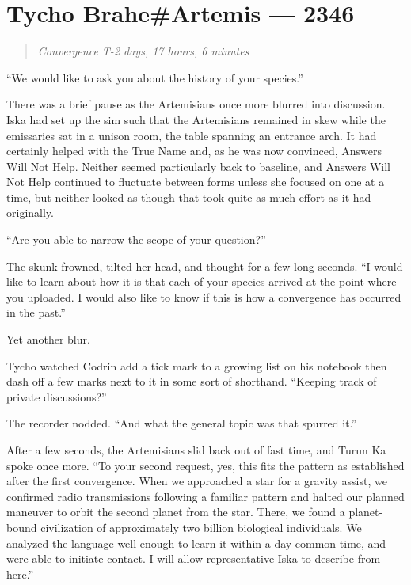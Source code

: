 \hypertarget{tycho-braheartemis-2346}{%
\chapter{Tycho Brahe\#Artemis — 2346}\label{tycho-braheartemis-2346}}

\begin{quote}
\emph{Convergence T-2 days, 17 hours, 6 minutes}
\end{quote}

``We would like to ask you about the history of your species.''

There was a brief pause as the Artemisians once more blurred into discussion. Iska had set up the sim such that the Artemisians remained in skew while the emissaries sat in a unison room, the table spanning an entrance arch. It had certainly helped with the True Name and, as he was now convinced, Answers Will Not Help. Neither seemed particularly back to baseline, and Answers Will Not Help continued to fluctuate between forms unless she focused on one at a time, but neither looked as though that took quite as much effort as it had originally.

``Are you able to narrow the scope of your question?''

The skunk frowned, tilted her head, and thought for a few long seconds. ``I would like to learn about how it is that each of your species arrived at the point where you uploaded. I would also like to know if this is how a convergence has occurred in the past.''

Yet another blur.

Tycho watched Codrin add a tick mark to a growing list on his notebook then dash off a few marks next to it in some sort of shorthand. ``Keeping track of private discussions?''

The recorder nodded. ``And what the general topic was that spurred it.''

After a few seconds, the Artemisians slid back out of fast time, and Turun Ka spoke once more. ``To your second request, yes, this fits the pattern as established after the first convergence. When we approached a star for a gravity assist, we confirmed radio transmissions following a familiar pattern and halted our planned maneuver to orbit the second planet from the star. There, we found a planet-bound civilization of approximately two billion biological individuals. We analyzed the language well enough to learn it within a day common time, and were able to initiate contact. I will allow representative Iska to describe from here.''

